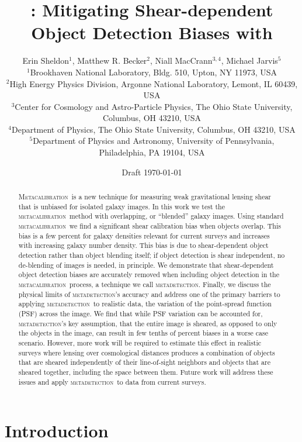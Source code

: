 \documentclass[fleqn,useAMS,usenatbib]{mnras}
\title[\Mdet]{\Mdet: Mitigating Shear-dependent Object Detection Biases with \Mcal}
\author[Sheldon et~al.]{Erin Sheldon$^1$, Matthew R. Becker$^2$,
Niall MacCrann$^{3,4}$, Michael Jarvis$^5$
  \\$^1$Brookhaven National Laboratory, Bldg. 510, Upton, NY 11973, USA
  \\$^2$High Energy Physics Division, Argonne National Laboratory, Lemont, IL 60439, USA
  \\$^3$Center for Cosmology and Astro-Particle Physics, The Ohio State University, Columbus, OH 43210, USA
  \\$^4$Department of Physics, The Ohio State University, Columbus, OH 43210, USA
  \\$^5$Department of Physics and Astronomy, University of Pennsylvania, Philadelphia, PA 19104, USA
}
\newcommand{\mcal}{\textsc{metacalibration}}
\newcommand{\mdet}{\textsc{metadetection}}
\newcommand{\Mcal}{\textsc{Metacalibration}}
\begin{document}
\date{Draft \today}
\maketitle

\begin{abstract}

    \Mcal\ is a new technique for measuring weak gravitational lensing shear
    that is unbiased for isolated galaxy images.  In this work we test the
    \mcal\ method with overlapping, or ``blended'' galaxy images.  Using
    standard \mcal\ we find a significant shear calibration bias when objects
    overlap.  This bias is a few percent for galaxy densities relevant for
    current surveys and increases with increasing galaxy number density.
    This bias is due to shear-dependent object detection rather than object
    blending itself; if object detection is shear independent, no de-blending
    of images is needed, in principle.  We demonstrate that shear-dependent
    object detection biases are accurately removed when including object
    detection in the \mcal\ process, a technique we call \mdet. Finally, we
    discuss the physical limits of \mdet's accuracy and address one of the
    primary barriers to applying \mdet\ to realistic data, the variation of the
    point-spread function (PSF) across the image. We find that while PSF variation
    can be accounted for, \mdet's key assumption, that the entire image is
    sheared, as opposed to only the objects in the image, can result in few
    tenths of percent biases in a worse case scenario. However, more work will
    be required to estimate this effect in realistic surveys where lensing over
    cosmological distances produces a combination of objects that are sheared
    independently of their line-of-sight neighbors and objects that are sheared
    together, including the space between them. Future work will address these
    issues and apply \mdet\ to data from current surveys.

\end{abstract}

\section{Introduction}
\end{document}
